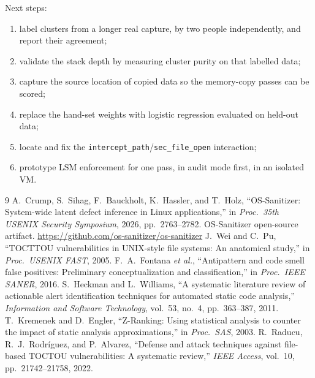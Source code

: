 \documentclass[11pt,a4paper]{article}
\newcommand{\pass}[1]{\texttt{#1}}
\begin{document}
Next steps:
\begin{enumerate}
  \item label clusters from a longer real capture, by two people independently, and report their
  agreement;
  \item validate the stack depth by measuring cluster purity on that labelled data;
  \item capture the source location of copied data so the memory-copy passes can be scored;
  \item replace the hand-set weights with logistic regression evaluated on held-out data;
  \item locate and fix the \pass{intercept\_path}/\pass{sec\_file\_open} interaction;
  \item prototype LSM enforcement for one pass, in audit mode first, in an isolated VM.
\end{enumerate}

\begin{thebibliography}{9}\small
{} A.~Crump, S.~Sihag, F.~Bauckholt, K.~Hassler, and T.~Holz, ``OS-Sanitizer:
System-wide latent defect inference in Linux applications,'' in \emph{Proc.\ 35th USENIX Security
Symposium}, 2026, pp.~2763--2782.
 OS-Sanitizer open-source artifact.
\url{https://github.com/os-sanitizer/os-sanitizer}
 J.~Wei and C.~Pu, ``TOCTTOU vulnerabilities in UNIX-style file systems: An
anatomical study,'' in \emph{Proc.\ USENIX FAST}, 2005.
 F.~A.~Fontana \emph{et al.}, ``Antipattern and code smell false positives:
Preliminary conceptualization and classification,'' in \emph{Proc.\ IEEE SANER}, 2016.
 S.~Heckman and L.~Williams, ``A systematic literature review of actionable alert
identification techniques for automated static code analysis,'' \emph{Information and Software
Technology}, vol.~53, no.~4, pp.~363--387, 2011.
 T.~Kremenek and D.~Engler, ``Z-Ranking: Using statistical analysis to counter the
impact of static analysis approximations,'' in \emph{Proc.\ SAS}, 2003.
 R.~Raducu, R.~J.~Rodr\'iguez, and P.~Alvarez, ``Defense and attack techniques against
file-based TOCTOU vulnerabilities: A systematic review,'' \emph{IEEE Access}, vol.~10,
pp.~21742--21758, 2022.
\end{thebibliography}
\end{document}
